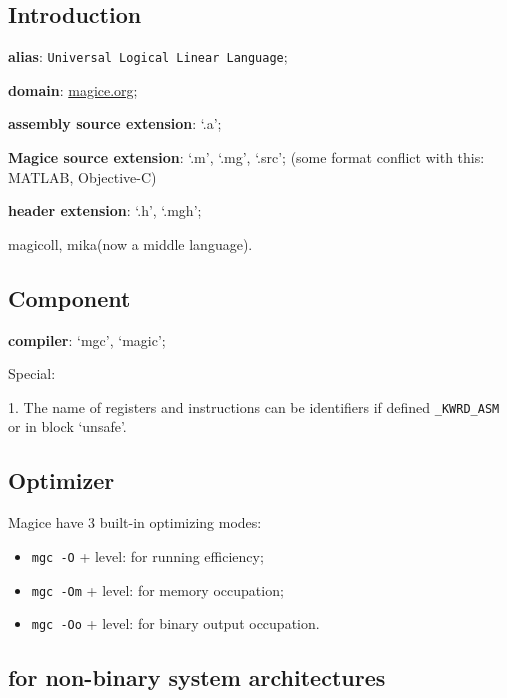 

\subsection{Introduction}

\textbf{alias}: \texttt{Universal Logical Linear Language};

\textbf{domain}: \href{http://magice.org}{magice.org};

\textbf{assembly source extension}: `.a';

\textbf{Magice source extension}: `.m', `.mg', `.src'; (some format conflict with this: MATLAB, Objective-C)

\textbf{header extension}: `.h', `.mgh';

 magicoll, mika(now a middle language).

\subsection{Component}

\textbf{compiler}: `mgc', `magic';

Special:

1. The name of registers and instructions can be identifiers if defined \verb|_KWRD_ASM| or in block `unsafe'.

\subsection{Optimizer}

Magice have 3 built-in optimizing modes:

\begin{itemize}
\item \verb|mgc -O| + level: for running efficiency;
\item \verb|mgc -Om| + level: for memory occupation;
\item \verb|mgc -Oo| + level: for binary output occupation.
\end{itemize}

\subsection{for non-binary system architectures}
